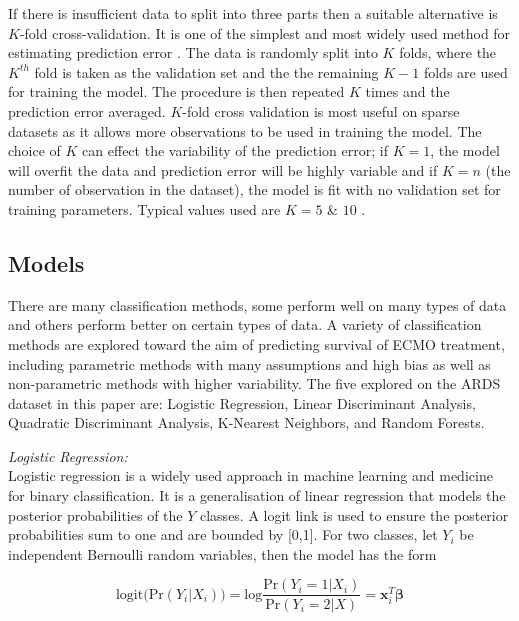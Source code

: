 \documentclass[12pt,]{article}
\begin{document}
If there is insufficient data to split into three parts then a suitable
alternative is \(K\)-fold cross-validation. It is one of the simplest
and most widely used method for estimating prediction error
\autocite{hastie_elements_2009}. The data is randomly split into \(K\)
folds, where the \(K^{th}\) fold is taken as the validation set and the
the remaining \(K-1\) folds are used for training the model. The
procedure is then repeated \(K\) times and the prediction error
averaged. \(K\)-fold cross validation is most useful on sparse datasets
as it allows more observations to be used in training the model. The
choice of \(K\) can effect the variability of the prediction error; if
\(K=1\), the model will overfit the data and prediction error will be
highly variable and if \(K=n\) (the number of observation in the
dataset), the model is fit with no validation set for training
parameters. Typical values used are \(K=5\) \& \(10\)
\autocites{hastie_elements_2009}{breiman_submodel_1992}{kohavi_study_1995}.

\subsection{Models}\label{models}

There are many classification methods, some perform well on many types
of data and others perform better on certain types of data. A variety of
classification methods are explored toward the aim of predicting
survival of ECMO treatment, including parametric methods with many
assumptions and high bias as well as non-parametric methods with higher
variability. The five explored on the ARDS dataset in this paper are:
Logistic Regression, Linear Discriminant Analysis, Quadratic
Discriminant Analysis, K-Nearest Neighbors, and Random Forests.

\emph{Logistic Regression:}\\
Logistic regression is a widely used approach in machine learning and
medicine for binary classification. It is a generalisation of linear
regression that models the posterior probabilities of the \(Y\) classes.
A logit link is used to ensure the posterior probabilities sum to one
and are bounded by {[}0,1{]}. For two classes, let \(Y_i\) be
independent Bernoulli random variables, then the model has the form

\[
\text{logit} \Big( \text{Pr}(Y_i \vert X_i) \Big) = \text{log} \frac{ \text{Pr}(Y_i=1 \vert X_i) }{ \text{Pr}(Y_i=2 \vert X) }  = \mathbf{x}^T_i\boldsymbol{\beta}  
\]
\end{document}
